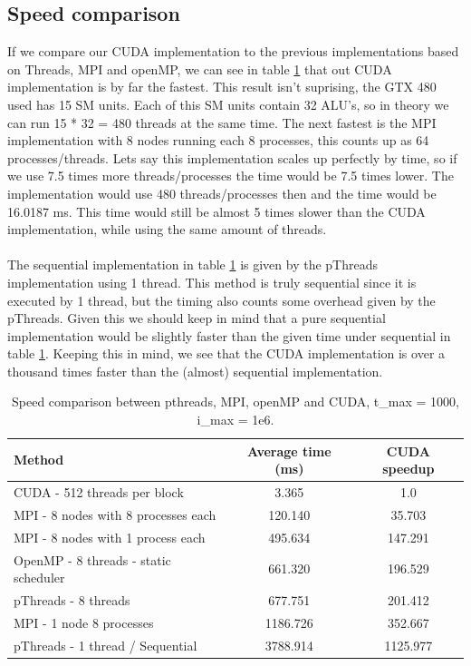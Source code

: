 \documentclass[a4paper]{article}
\begin{document}
	\subsection{Speed comparison}
		If we compare our CUDA implementation to the previous implementations based on Threads, MPI and openMP, we can see in table \ref{table:speedComparison} that out CUDA implementation is by far the fastest.
		This result isn't suprising, the GTX 480 used has 15 SM units.
		Each of this SM units contain 32 ALU's, so in theory we can run 15 * 32 = 480 threads at the same time.
		The next fastest is the MPI implementation with 8 nodes running each 8 processes, this counts up as 64 processes/threads.
		Lets say this implementation scales up perfectly by time, so if we use 7.5 times more threads/processes the time would be 7.5 times lower.
		The implementation would use 480 threads/processes then and the time would be 16.0187 ms.
		This time would still be almost 5 times slower than the CUDA implementation, while using the same amount of threads.\\
		\\
		The sequential implementation in table \ref{table:speedComparison} is given by the pThreads implementation using 1 thread.
		This method is truly sequential since it is executed by 1 thread, but the timing also counts some overhead given by the pThreads.
		Given this we should keep in mind that a pure sequential implementation would be slightly faster than the given time under sequential in table \ref{table:speedComparison}.
		Keeping this in mind, we see that the CUDA implementation is over a thousand times faster than the (almost) sequential implementation.
		
		\begin{table}[H]
			\caption{Speed comparison between pthreads, MPI, openMP and CUDA, t\_max = 1000, i\_max = 1e6.}
			\label{table:speedComparison}
			\begin{center}
				\begin{tabular}{| l | c | c |}
					\hline
					Method & Average time (ms) & CUDA speedup\\
					\hline
					CUDA - 512 threads per block & 3.365 & 1.0\\
					\hline
					MPI - 8 nodes with 8 processes each & 120.140 & 35.703\\
					\hline
					MPI - 8 nodes with 1 process each & 495.634 & 147.291\\
					\hline
					OpenMP - 8 threads - static scheduler & 661.320 & 196.529\\
					\hline
					pThreads - 8 threads & 677.751 & 201.412\\
					\hline
					MPI - 1 node 8 processes & 1186.726 & 352.667\\
					\hline
					pThreads - 1 thread / Sequential & 3788.914 & 1125.977\\
					\hline
				\end{tabular}
			\end{center}
		\end{table}
	
\end{document}
